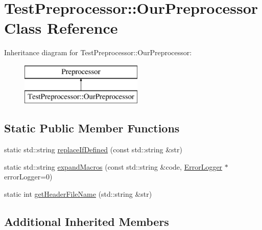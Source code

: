 \hypertarget{class_test_preprocessor_1_1_our_preprocessor}{\section{Test\-Preprocessor\-:\-:Our\-Preprocessor Class Reference}
\label{class_test_preprocessor_1_1_our_preprocessor}
}
Inheritance diagram for Test\-Preprocessor\-:\-:Our\-Preprocessor\-:\begin{figure}[H]
\begin{center}
\leavevmode
\includegraphics[height=2.000000cm]{class_test_preprocessor_1_1_our_preprocessor}
\end{center}
\end{figure}
\subsection*{Static Public Member Functions}
\begin{DoxyCompactItemize}
\item 
static std\-::string \hyperlink{class_test_preprocessor_1_1_our_preprocessor_af12ca9b97a1f1647f5f850736913c3ef}{replace\-If\-Defined} (const std\-::string \&str)
\item 
static std\-::string \hyperlink{class_test_preprocessor_1_1_our_preprocessor_a2ac0719b46d05b4dd2691ca13172bdef}{expand\-Macros} (const std\-::string \&code, \hyperlink{class_error_logger}{Error\-Logger} $\ast$error\-Logger=0)
\item 
static int \hyperlink{class_test_preprocessor_1_1_our_preprocessor_a2bb383ae9a5f37f503e93cf243dc4f67}{get\-Header\-File\-Name} (std\-::string \&str)
\end{DoxyCompactItemize}
\subsection*{Additional Inherited Members}


